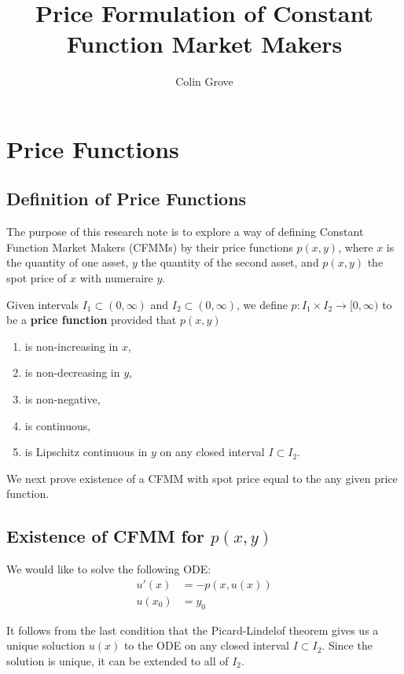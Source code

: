 \documentclass[11pt]{article} %
\title{Price Formulation of Constant Function Market Makers}
\author{Colin Grove}
\affil{HydraDX}
\date{} %
\begin{document}
\maketitle

\section{Price Functions}

\subsection{Definition of Price Functions}

The purpose of this research note is to explore a way of defining Constant Function Market Makers (CFMMs) by their price functions $p(x,y)$, where $x$ is the quantity of one asset, $y$ the quantity of the second asset, and $p(x,y)$ the spot price of $x$ with numeraire $y$.

Given intervals $I_1\subset (0,\infty)$ and $I_2\subset (0,\infty)$, we define $p:I_1 \times I_2 \to [0,\infty)$ to be a \textbf{price function} provided that $p(x,y)$
\begin{enumerate}
\item is non-increasing in $x$,
\item is non-decreasing in $y$,
\item is non-negative,
\item is continuous,
\item is Lipschitz continuous in $y$ on any closed interval $I \subset I_2$.
\end{enumerate}

We next prove existence of a CFMM with spot price equal to the any given price function.

\subsection{Existence of CFMM for $p(x,y)$}

We would like to solve the following ODE:
\begin{align*}
u'(x) &= -p(x,u(x))\\
u(x_0) &= y_0
\end{align*}

It follows from the last condition that the Picard-Lindelof theorem gives us a unique soluction $u(x)$ to the ODE on any closed interval $I\subset I_2$.
Since the solution is unique, it can be extended to all of $I_2$.
\end{document}

